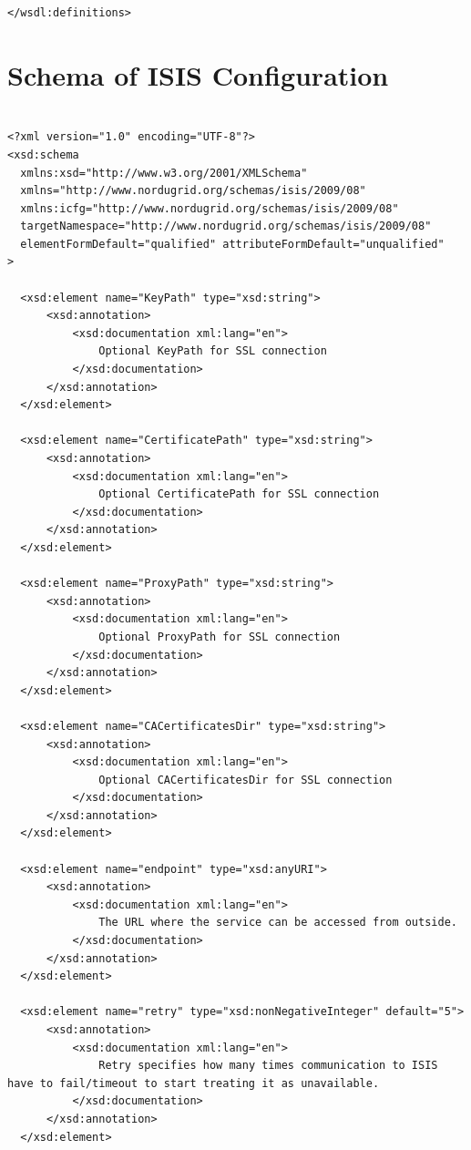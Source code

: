 \documentclass{book}
\begin{document}
\begin{verbatim}
</wsdl:definitions>
\end{verbatim}


\section{Schema of ISIS Configuration}
\label{annex:isis_configuration_schema}
\begin{verbatim}

<?xml version="1.0" encoding="UTF-8"?>
<xsd:schema
  xmlns:xsd="http://www.w3.org/2001/XMLSchema"
  xmlns="http://www.nordugrid.org/schemas/isis/2009/08"
  xmlns:icfg="http://www.nordugrid.org/schemas/isis/2009/08"
  targetNamespace="http://www.nordugrid.org/schemas/isis/2009/08"
  elementFormDefault="qualified" attributeFormDefault="unqualified"
>

  <xsd:element name="KeyPath" type="xsd:string">
      <xsd:annotation>
          <xsd:documentation xml:lang="en">
              Optional KeyPath for SSL connection
          </xsd:documentation>
      </xsd:annotation>
  </xsd:element>

  <xsd:element name="CertificatePath" type="xsd:string">
      <xsd:annotation>
          <xsd:documentation xml:lang="en">
              Optional CertificatePath for SSL connection
          </xsd:documentation>
      </xsd:annotation>
  </xsd:element>

  <xsd:element name="ProxyPath" type="xsd:string">
      <xsd:annotation>
          <xsd:documentation xml:lang="en">
              Optional ProxyPath for SSL connection
          </xsd:documentation>
      </xsd:annotation>
  </xsd:element>

  <xsd:element name="CACertificatesDir" type="xsd:string">
      <xsd:annotation>
          <xsd:documentation xml:lang="en">
              Optional CACertificatesDir for SSL connection
          </xsd:documentation>
      </xsd:annotation>
  </xsd:element>

  <xsd:element name="endpoint" type="xsd:anyURI">
      <xsd:annotation>
          <xsd:documentation xml:lang="en">
              The URL where the service can be accessed from outside.
          </xsd:documentation>
      </xsd:annotation>
  </xsd:element>

  <xsd:element name="retry" type="xsd:nonNegativeInteger" default="5">
      <xsd:annotation>
          <xsd:documentation xml:lang="en">
              Retry specifies how many times communication to ISIS have to fail/timeout to start treating it as unavailable.
          </xsd:documentation>
      </xsd:annotation>
  </xsd:element>


\end{verbatim}
\end{document}
